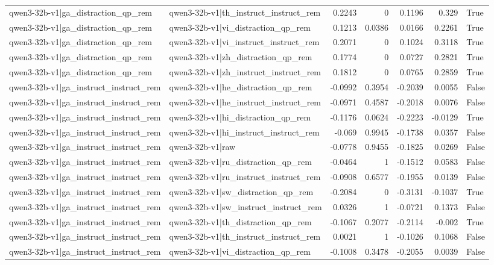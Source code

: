 \begin{table}
\begin{tabular}{l l r r r r l}
qwen3-32b-v1|ga_distraction_qp_rem & qwen3-32b-v1|th_instruct_instruct_rem & 0.2243 & 0 & 0.1196 & 0.329 & True \\
qwen3-32b-v1|ga_distraction_qp_rem & qwen3-32b-v1|vi_distraction_qp_rem & 0.1213 & 0.0386 & 0.0166 & 0.2261 & True \\
qwen3-32b-v1|ga_distraction_qp_rem & qwen3-32b-v1|vi_instruct_instruct_rem & 0.2071 & 0 & 0.1024 & 0.3118 & True \\
qwen3-32b-v1|ga_distraction_qp_rem & qwen3-32b-v1|zh_distraction_qp_rem & 0.1774 & 0 & 0.0727 & 0.2821 & True \\
qwen3-32b-v1|ga_distraction_qp_rem & qwen3-32b-v1|zh_instruct_instruct_rem & 0.1812 & 0 & 0.0765 & 0.2859 & True \\
qwen3-32b-v1|ga_instruct_instruct_rem & qwen3-32b-v1|he_distraction_qp_rem & -0.0992 & 0.3954 & -0.2039 & 0.0055 & False \\
qwen3-32b-v1|ga_instruct_instruct_rem & qwen3-32b-v1|he_instruct_instruct_rem & -0.0971 & 0.4587 & -0.2018 & 0.0076 & False \\
qwen3-32b-v1|ga_instruct_instruct_rem & qwen3-32b-v1|hi_distraction_qp_rem & -0.1176 & 0.0624 & -0.2223 & -0.0129 & True \\
qwen3-32b-v1|ga_instruct_instruct_rem & qwen3-32b-v1|hi_instruct_instruct_rem & -0.069 & 0.9945 & -0.1738 & 0.0357 & False \\
qwen3-32b-v1|ga_instruct_instruct_rem & qwen3-32b-v1|raw & -0.0778 & 0.9455 & -0.1825 & 0.0269 & False \\
qwen3-32b-v1|ga_instruct_instruct_rem & qwen3-32b-v1|ru_distraction_qp_rem & -0.0464 & 1 & -0.1512 & 0.0583 & False \\
qwen3-32b-v1|ga_instruct_instruct_rem & qwen3-32b-v1|ru_instruct_instruct_rem & -0.0908 & 0.6577 & -0.1955 & 0.0139 & False \\
qwen3-32b-v1|ga_instruct_instruct_rem & qwen3-32b-v1|sw_distraction_qp_rem & -0.2084 & 0 & -0.3131 & -0.1037 & True \\
qwen3-32b-v1|ga_instruct_instruct_rem & qwen3-32b-v1|sw_instruct_instruct_rem & 0.0326 & 1 & -0.0721 & 0.1373 & False \\
qwen3-32b-v1|ga_instruct_instruct_rem & qwen3-32b-v1|th_distraction_qp_rem & -0.1067 & 0.2077 & -0.2114 & -0.002 & True \\
qwen3-32b-v1|ga_instruct_instruct_rem & qwen3-32b-v1|th_instruct_instruct_rem & 0.0021 & 1 & -0.1026 & 0.1068 & False \\
qwen3-32b-v1|ga_instruct_instruct_rem & qwen3-32b-v1|vi_distraction_qp_rem & -0.1008 & 0.3478 & -0.2055 & 0.0039 & False \\

\end{tabular}
\end{table}
